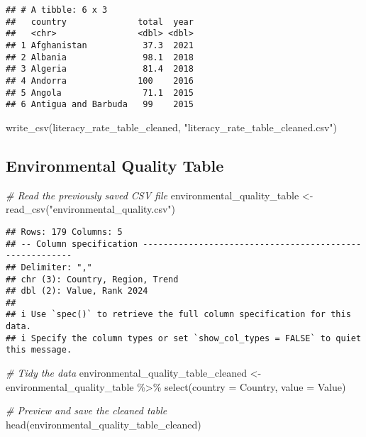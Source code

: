 \documentclass[
]{article}
\newenvironment{Shaded}{\begin{snugshade}}{\end{snugshade}}
\newcommand{\AttributeTok}[1]{\textcolor[rgb]{0.77,0.63,0.00}{#1}}
\newcommand{\CommentTok}[1]{\textcolor[rgb]{0.56,0.35,0.01}{\textit{#1}}}
\newcommand{\FunctionTok}[1]{\textcolor[rgb]{0.00,0.00,0.00}{#1}}
\newcommand{\NormalTok}[1]{#1}
\newcommand{\OtherTok}[1]{\textcolor[rgb]{0.56,0.35,0.01}{#1}}
\newcommand{\SpecialCharTok}[1]{\textcolor[rgb]{0.00,0.00,0.00}{#1}}
\newcommand{\StringTok}[1]{\textcolor[rgb]{0.31,0.60,0.02}{#1}}
\begin{document}
\begin{verbatim}
## # A tibble: 6 x 3
##   country              total  year
##   <chr>                <dbl> <dbl>
## 1 Afghanistan           37.3  2021
## 2 Albania               98.1  2018
## 3 Algeria               81.4  2018
## 4 Andorra              100    2016
## 5 Angola                71.1  2015
## 6 Antigua and Barbuda   99    2015
\end{verbatim}

\begin{Shaded}
\begin{Highlighting}[]
\FunctionTok{write\_csv}\NormalTok{(literacy\_rate\_table\_cleaned, }\StringTok{"literacy\_rate\_table\_cleaned.csv"}\NormalTok{)}
\end{Highlighting}
\end{Shaded}

\hypertarget{environmental-quality-table}{%
\subsection{Environmental Quality
Table}\label{environmental-quality-table}}

\begin{Shaded}
\begin{Highlighting}[]
\CommentTok{\# Read the previously saved CSV file}
\NormalTok{environmental\_quality\_table }\OtherTok{\textless{}{-}} \FunctionTok{read\_csv}\NormalTok{(}\StringTok{"environmental\_quality.csv"}\NormalTok{)}
\end{Highlighting}
\end{Shaded}

\begin{verbatim}
## Rows: 179 Columns: 5
## -- Column specification --------------------------------------------------------
## Delimiter: ","
## chr (3): Country, Region, Trend
## dbl (2): Value, Rank 2024
## 
## i Use `spec()` to retrieve the full column specification for this data.
## i Specify the column types or set `show_col_types = FALSE` to quiet this message.
\end{verbatim}

\begin{Shaded}
\begin{Highlighting}[]
\CommentTok{\# Tidy the data}
\NormalTok{environmental\_quality\_table\_cleaned }\OtherTok{\textless{}{-}}\NormalTok{ environmental\_quality\_table }\SpecialCharTok{\%\textgreater{}\%}
  \FunctionTok{select}\NormalTok{(}\AttributeTok{country =} \StringTok{\textasciigrave{}}\AttributeTok{Country}\StringTok{\textasciigrave{}}\NormalTok{, }\AttributeTok{value =} \StringTok{\textasciigrave{}}\AttributeTok{Value}\StringTok{\textasciigrave{}}\NormalTok{)}

\CommentTok{\# Preview and save the cleaned table}
\FunctionTok{head}\NormalTok{(environmental\_quality\_table\_cleaned)}
\end{Highlighting}
\end{Shaded}
\end{document}
